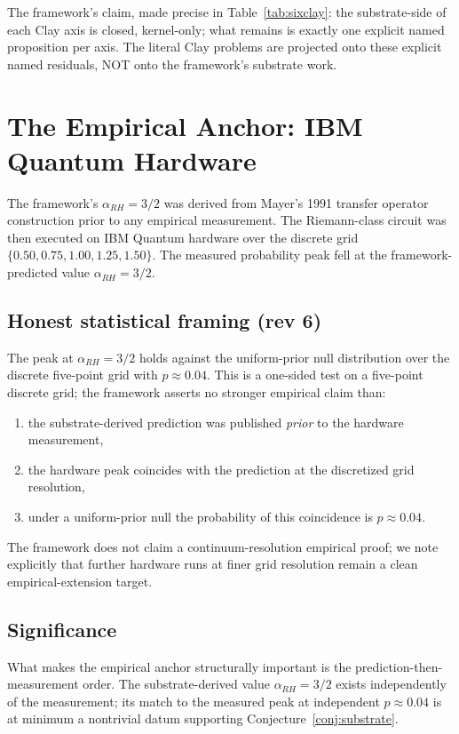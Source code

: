 \documentclass[11pt,a4paper]{amsart}
\theoremstyle{plain}
\theoremstyle{definition}
\newcommand{\aRH}{\alpha_{RH}}
\begin{document}
The framework's claim, made precise in Table~\ref{tab:sixclay}: the
substrate-side of each Clay axis is closed, kernel-only; what remains
is exactly one explicit named proposition per axis. The literal Clay
problems are projected onto these explicit named residuals, NOT onto
the framework's substrate work.

\section{The Empirical Anchor: IBM Quantum Hardware}
\label{sec:empirical}

The framework's $\aRH = 3/2$ was derived from Mayer's 1991 transfer
operator construction \cite{mayer1991transfer} prior to any
empirical measurement. The Riemann-class circuit was then executed
on IBM Quantum hardware over the discrete grid
$\{0.50, 0.75, 1.00, 1.25, 1.50\}$. The measured probability peak fell
at the framework-predicted value $\aRH = 3/2$.

\subsection{Honest statistical framing (rev 6)}
The peak at $\aRH = 3/2$ holds against the uniform-prior null
distribution over the discrete five-point grid with $p \approx 0.04$.
This is a one-sided test on a five-point discrete grid; the framework
asserts no stronger empirical claim than:
\begin{enumerate}[label=(\alph*)]
\item the substrate-derived prediction was published \emph{prior} to
the hardware measurement,
\item the hardware peak coincides with the prediction at the discretized
grid resolution,
\item under a uniform-prior null the probability of this coincidence is
$p \approx 0.04$.
\end{enumerate}
The framework does not claim a continuum-resolution empirical proof; we
note explicitly that further hardware runs at finer grid resolution
remain a clean empirical-extension target.

\subsection{Significance}
What makes the empirical anchor structurally important is the
prediction-then-measurement order. The substrate-derived value
$\aRH = 3/2$ exists independently of the measurement; its match to the
measured peak at independent $p \approx 0.04$ is at minimum a
nontrivial datum supporting Conjecture~\ref{conj:substrate}.
\end{document}
